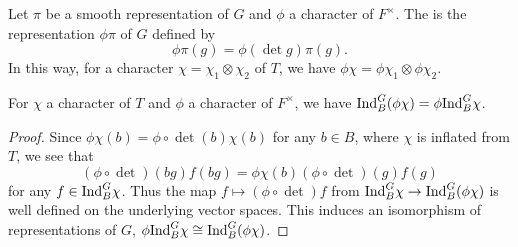 \begin{defn}
    Let $\pi$ be a smooth representation of $G$ and $\phi$ a character of $F^\times$. The  is the representation $\phi\pi$ of $G$ defined by 
    $$\phi \pi(g) = \phi (\det g)\pi(g).$$
    In this way, for a character $\chi=\chi_1 \otimes \chi_2$ of $T$, we have $\phi\chi = \phi\chi_1 \otimes \phi\chi_2$. 
\end{defn}

\begin{lemma}
    For $\chi$ a character of $T$ and $\phi$ a character of $F^\times$, we have $\mathrm{Ind}_B^G(\phi\chi) = \phi\mathrm{Ind}_B^G \chi$.
\end{lemma}
\begin{proof}
    Since $\phi\chi(b) = \phi \circ \det(b) \chi(b)$ for any $b \in B$, where $\chi$ is inflated from $T$, we see that 
    $$(\phi \circ \det)(bg)f(bg) = \phi\chi(b)(\phi \circ \det)(g)f(g)$$ for any $f \in \mathrm{Ind}_B^G \chi$. Thus the map $f \mapsto (\phi \circ \det)f$ from $\mathrm{Ind}_B^G \chi \to \mathrm{Ind}_B^G(\phi\chi)$ is well defined on the underlying vector spaces. This induces an isomorphism of representations of $G$, $\phi\mathrm{Ind}_B^G \chi \cong \mathrm{Ind}_B^G(\phi\chi)$.
\end{proof}

